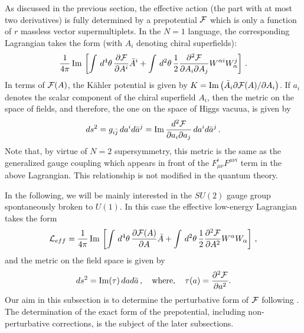 As discussed in the previous section, the effective action (the part
with at most two derivatives) is fully determined by a prepotential
${\cal F}$ which is only a function of $r$ massless vector
supermultiplets.  In the $N=1$ language, the corresponding Lagrangian
takes the form (with $A_i$ denoting chiral superfields):
$$
\frac{1}{4\pi} \, {\rm Im} \, \left [ \int \, d^{4}\theta \,
\frac{\partial {\cal F}}{\partial A^{i}} \bar{A}^{i} +
\int \, d^{2} \theta \, \frac{1}{2}
\frac{\partial^{2}{\cal F}}{\partial A_{i} \partial A_{j}}
W^{\alpha i} W^j_\alpha
\right ]\,.
$$
In terms of ${\cal F}(A)$, the  K\"{a}hler potential is given by
$K={\rm Im}\left(\bar{A}_{i}\partial{\cal F}(A)/\partial A_{i}\right)$. 
If $a_i$ denotes the scalar component of the chiral superfield $A_i$,
then the metric on the space of fields, and therefore, the one on the
space of Higgs vacuua, is given by
$$
ds^2 = g_{i\bar{j}}\,da^i d\bar{a}^j =
{\rm Im}\,\frac{d^2{\cal F}}{\partial a_i \partial a_j}
\, da^i d\bar{a}^j \,.
$$
Note that, by virtue of $N=2$ supersymmetry, this metric is the same
as the generalized gauge coupling which appears in front of the
$F_{\mu\nu}^iF^{\mu\nu i}$ term in the above Lagrangian. This
relationship is not modified in the quantum theory.   

In the following, we will be mainly interested in the $SU(2)$ gauge
group spontaneously broken to $U(1)$. In this case the effective
low-energy Lagrangian takes the form
\begin{equation}
{\cal L}_{eff}=
\frac{1}{4\pi} \, {\rm Im} \, \left [ \int \, d^{4}\theta \,
\frac{\partial {\cal F}(A)}{\partial A} \bar{A} +
\int \, d^{2} \theta \, \frac{1}{2}
\frac{\partial^{2}{\cal F}}{\partial A^{2}} W^{\alpha} W_{\alpha}
\right ]\,, 
\label{EA}
\end{equation}
and the metric on the field space is given by
\begin{equation}
ds^2= {\rm Im}(\tau)\, da d\bar a\,,\quad {\rm where},\quad
\tau (a) = \frac{\partial^{2} {\cal F}}{\partial a^{2}}.
\label{metric}
\end{equation}
Our aim in this subsection is to determine the perturbative form of
${\cal F}$ following \cite{Seiberg88}. The determination of the exact
form of the prepotential, including non-perturbative corrections, is
the subject of the later subsections. 

